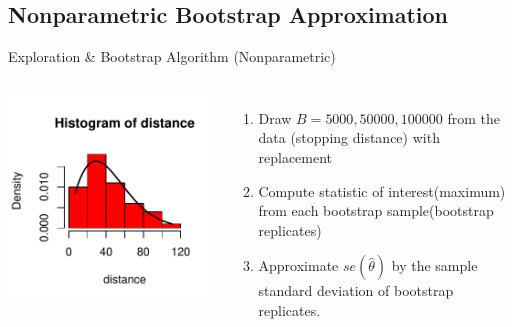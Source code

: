 \documentclass[a4paper,9pt]{beamer}\usepackage[]{graphicx}\usepackage[]{color}
\makeatletter
\def\maxwidth{ %
  \ifdim\Gin@nat@width>\linewidth
    \linewidth
  \else
    \Gin@nat@width
  \fi
}
\newenvironment{knitrout}{}{} %
\makeatother
\begin{document}
\subsection{Nonparametric Bootstrap Approximation}
\begin{frame}{Exploration \& Bootstrap Algorithm (Nonparametric)}
\begin{columns}
\begin{knitrout}
\color{fgcolor}
\includegraphics[width=\maxwidth]{figure/explore3-1} 

\end{knitrout}
\begin{enumerate}[i]
\item Draw $B=5000, 50000, 100000$ from the data (stopping distance) with replacement
\item Compute statistic of interest(maximum) from each bootstrap sample(bootstrap replicates)
\item Approximate $se(\hat{\theta})$ by the sample standard deviation of bootstrap replicates.
\end{enumerate}
\end{columns}
\end{frame}
\end{document}
